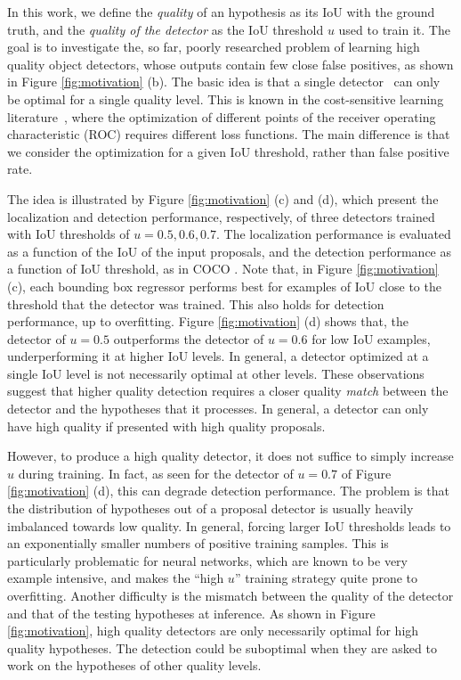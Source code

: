\documentclass[10pt,twocolumn,letterpaper]{article}
\begin{document}
In this work, we define the {\it quality\/} of an hypothesis as its IoU with
the ground truth, and the {\it quality of the detector\/} as the IoU threshold
$u$ used to train it. The goal is to investigate the, so far, poorly
researched problem of learning high quality object detectors,
whose outputs contain few close false positives, as shown in
Figure \ref{fig:motivation} (b). The basic idea is that a single detector \
can only be optimal for a single quality level. This is known in the
cost-sensitive learning literature~\cite{DBLP:conf/ijcai/Elkan01,
DBLP:journals/pami/Masnadi-ShiraziV11}, where the optimization of
different points of the receiver operating characteristic (ROC) requires
different loss functions. The main difference is that we consider
the optimization for a given IoU threshold, rather than false positive rate.

The idea is illustrated by Figure \ref{fig:motivation} (c) and (d), which
present the localization and detection performance, respectively, of
three detectors trained with IoU thresholds of $u=0.5,0.6,0.7$. The
localization performance is evaluated
as a function of the IoU of the input proposals, and the detection
performance as a function of IoU threshold, as in
COCO \cite{DBLP:conf/eccv/LinMBHPRDZ14}. Note that, in
Figure \ref{fig:motivation} (c), each bounding box regressor performs
best for examples of IoU close to the threshold that the detector
was trained. This also holds for detection performance, up to overfitting.
Figure \ref{fig:motivation} (d) shows that, the detector of $u=0.5$
outperforms the detector of $u=0.6$ for low IoU examples, underperforming
it at higher IoU levels. In general, a detector optimized at a single IoU
level is not necessarily optimal at other levels.
These observations suggest that higher quality detection requires a
closer quality {\it match\/} between the detector and the
hypotheses that it processes. In general, a detector can only
have high quality if presented with high quality proposals.

However, to produce a high quality detector, it does not suffice to
simply increase $u$ during training. In fact, as seen for the detector
of $u=0.7$ of Figure \ref{fig:motivation} (d), this can degrade detection
performance. The problem is that the distribution of hypotheses
out of a proposal detector is usually heavily imbalanced towards low
quality. In general, forcing larger IoU thresholds leads to an
exponentially smaller numbers of positive training samples. This is
particularly problematic for neural networks, which are known to be very
example intensive, and makes the ``high $u$'' training strategy
quite prone to overfitting. Another difficulty is the
mismatch between the quality of the detector and that of the testing
hypotheses at inference. As shown in Figure \ref{fig:motivation},
high quality detectors are only necessarily optimal for high quality
hypotheses. The detection could be suboptimal when they are asked to work
on the hypotheses of other quality levels.
\end{document}
